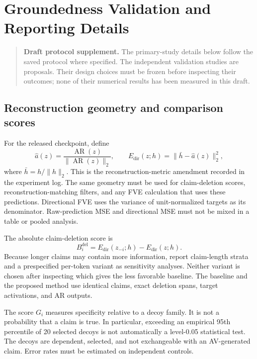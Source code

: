 
\section{Groundedness Validation and Reporting Details}
\label{app:grounding-validation}

\begin{quote}
\small\textbf{Draft protocol supplement.} The primary-study details below
follow the saved protocol where specified. The independent validation studies
are proposals. Their design choices must be frozen before inspecting their
outcomes; none of their numerical results has been measured in this draft.
\end{quote}

\subsection{Reconstruction geometry and comparison scores}

For the released checkpoint, define
\begin{equation}
 \widehat{a}(z)=\frac{\operatorname{AR}(z)}{\|\operatorname{AR}(z)\|_2},
 \qquad
 E_{\mathrm{dir}}(z;h)=\|\bar h-\widehat{a}(z)\|_2^2,
\end{equation}
where $\bar h=h/\|h\|_2$. This is the reconstruction-metric amendment recorded
in the experiment log. The same geometry must be used for claim-deletion
scores, reconstruction-matching filters, and any FVE calculation that uses
these predictions. Directional FVE uses the variance of unit-normalized targets
as its denominator. Raw-prediction MSE and directional MSE must not be mixed
in a table or pooled analysis.

The absolute claim-deletion score is
\begin{equation}
B_i^{\mathrm{del}}=E_{\mathrm{dir}}(z_{-i};h)-E_{\mathrm{dir}}(z;h).
\end{equation}
Because longer claims may contain more information, report claim-length
strata and a prespecified per-token variant as sensitivity analyses. Neither
variant is chosen after inspecting which gives the less favorable baseline.
The baseline and the proposed method use identical claims, exact deletion
spans, target activations, and AR outputs.

The score $G_i$ measures specificity relative to a decoy family. It is not a
probability that a claim is true. In particular, exceeding an empirical 95th
percentile of 20 selected decoys is not automatically a level-0.05 statistical
test. The decoys are dependent, selected, and not exchangeable with an
AV-generated claim. Error rates must be estimated on independent controls.

